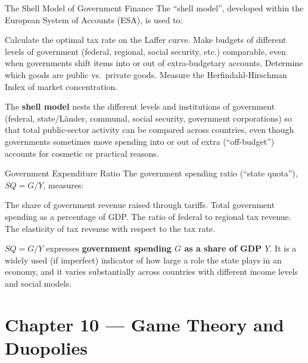 \begin{question}[type=mc]{The Shell Model of Government Finance}
The ``shell model'', developed within the European System of Accounts (ESA),
is used to:
\begin{choices}
  \choice        Calculate the optimal tax rate on the Laffer curve.
  \correctchoice Make budgets of different levels of government (federal,
                 regional, social security, etc.) comparable, even when
                 governments shift items into or out of extra-budgetary
                 accounts.
  \choice        Determine which goods are public vs.\ private goods.
  \choice        Measure the Herfindahl-Hirschman Index of market
                 concentration.
\end{choices}
\begin{solution}
  The \textbf{shell model} nests the different levels and institutions of
  government (federal, state/Länder, communal, social security, government
  corporations) so that total public-sector activity can be compared across
  countries, even though governments sometimes move spending into or out of
  extra (``off-budget'') accounts for cosmetic or practical reasons.
\end{solution}
\end{question}

\begin{question}[type=mc]{Government Expenditure Ratio}
The government spending ratio (``state quota''), $SQ = G/Y$, measures:
\begin{choices}
  \choice        The share of government revenue raised through tariffs.
  \correctchoice Total government spending as a percentage of GDP.
  \choice        The ratio of federal to regional tax revenue.
  \choice        The elasticity of tax revenue with respect to the tax rate.
\end{choices}
\begin{solution}
  $SQ = G/Y$ expresses \textbf{government spending $G$ as a share of GDP
  $Y$}. It is a widely used (if imperfect) indicator of how large a role the
  state plays in an economy, and it varies substantially across countries
  with different income levels and social models.
\end{solution}
\end{question}


\section{Chapter 10 — Game Theory and Duopolies}


